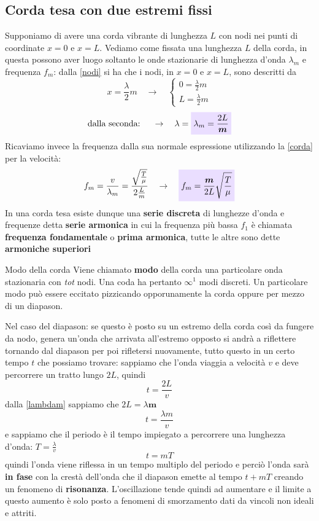 \documentclass[x11names]{report}
\newcommand{\viola}[1]{\colorbox{yred}{$\displaystyle #1$}}
\begin{document}
	\subsection{Corda tesa con due estremi fissi}
	Supponiamo di avere una corda vibrante di lunghezza \(L\) con nodi nei punti di coordinate \(x=0\) e \(x=L\). Vediamo come fissata una lunghezza \(L\) della corda, in questa possono aver luogo soltanto le onde stazionarie di lunghezza d'onda \(\lambda_m\) e frequenza \(f_m\): dalla \ref{nodi} si ha che i nodi, in \(x=0\) e \(x=L\), sono descritti da
	\[ 
	x = \frac{\lambda}{2}m \quad \rightarrow \quad \begin{cases}
		0 = \frac{\lambda}{2}m\\ L = \frac{\lambda}{2}m
	\end{cases}
	\]
	\begin{equation}\label{lambdam}
		\text{dalla seconda: }\quad \to \quad \lambda = \viola{\lambda_m = \frac{2L}{\boldsymbol{m}}}
	\end{equation}
	Ricaviamo invece la frequenza dalla sua normale espressione utilizzando la \ref{corda} per la velocità:
	\[ 
	f_m = \frac{v}{\lambda_m} = \frac{\sqrt{\frac{T}{\mu}}}{2\frac{L}{m}} \quad \rightarrow \quad  \viola{f_m = \frac{\boldsymbol{m}}{2L}\sqrt{\frac{T}{\mu}}}
	\]
	In una corda tesa esiste dunque una \textbf{serie discreta} di lunghezze d'onda e frequenze detta \textbf{serie armonica} in  cui  la frequenza più bassa  \(f_1\) è chiamata \textbf{frequenza fondamentale} o \textbf{prima armonica}, tutte le altre sono dette \textbf{armoniche superiori}
	
	\begin{center}
		\colorbox{yblue}{\begin{minipage}{5.75in}
				\begin{blues}{Modo della corda}
					Viene chiamato \textbf{modo} della corda una particolare onda stazionaria con \textit{tot} nodi. Una coda ha pertanto \(\infty^1\) modi discreti. Un particolare modo può essere eccitato pizzicando opporunamente la corda oppure per mezzo di un diapason.
				\end{blues}
		\end{minipage}}
	\end{center}
	
	
	Nel caso del diapason: se questo è posto su un estremo della corda così da fungere da nodo, genera un'onda che arrivata all'estremo opposto si andrà a riflettere tornando dal diapason per poi rifletersi nuovamente, tutto questo in un certo tempo \(t\) che possiamo trovare: sappiamo che l'onda viaggia a velocità \(v\) e deve percorrere un tratto lungo \(2L\), quindi 
	\[ 
	t = \frac{2L}{v}
	\]
	dalla \ref{lambdam} sappiamo che \(2L = \lambda \boldsymbol{m}\)
	\[ 
	t = \frac{\lambda m}{v}
	\]
	e sappiamo che il periodo è il tempo impiegato a percorrere una lunghezza d'onda: \(T = \frac{\lambda}{v}\)
	\[ 
	t = mT
	\]
	quindi l'onda viene riflessa in un tempo multiplo del periodo e perciò l'onda sarà \textbf{in fase} con la crestà dell'onda che il diapason emette al tempo \(t + mT\) creando un fenomeno di \textbf{risonanza}. L'oscillazione tende quindi ad aumentare e il limite a questo aumento è solo posto a fenomeni di smorzamento dati da vincoli non ideali e attriti.
	
\end{document}
